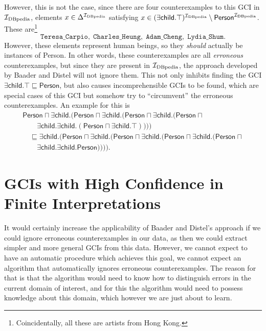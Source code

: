 However, this is not the case, since there are four counterexamples to this GCI in
${\mathcal{I}_{\text{DBpedia}}}$, \ie elements $x \in \Delta^{{\mathcal{I}_{\text{DBpedia}}}}$ satisfying $x \in (\mathsf{\exists
  child. \top})^{{\mathcal{I}_{\text{DBpedia}}}} \setminus \mathsf{Person}^{{\mathcal{I}_{\text{DBpedia}}}}$.  These
are\footnote{Coincidentally, all these are artists from Hong Kong.}
\begin{equation*}
  \mathtt{Teresa\_Carpio},\; \mathtt{Charles\_Heung},\;
  \mathtt{Adam\_Cheng}, \; \mathtt{Lydia\_Shum}.
\end{equation*}
However, these elements represent human beings, so they \emph{should} actually be
instances of \textsf{Person}.  In other words, these counterexamples are all
\emph{erroneous} counterexamples, but since they are present in ${\mathcal{I}_{\text{DBpedia}}}$, the approach
developed by Baader and Distel will not ignore them.  This not only inhibits finding the
GCI $\mathsf{\exists child. \top \sqsubseteq Person}$, but also causes incomprehensible
GCIs to be found, which are special cases of this GCI but somehow try to
\enquote{circumvent} the erroneous counterexamples. An example for this is
\begin{gather*}
  \mathsf{Person \sqcap \exists child. (Person \sqcap \exists child. (Person \sqcap \exists child.
    (Person \sqcap {}}\\
  \quad \quad \mathsf{\exists child. \exists child. (Person \sqcap \exists child. \top))))}
  \\
  \mathsf{ \quad \sqsubseteq
    \exists child. (Person \sqcap \exists child. (Person \sqcap \exists child. (Person \sqcap
    \exists child. (Person \sqcap {}}\\
  \mathsf{\quad \quad \exists child. \exists child. Person))))}.
\end{gather*}

\section{GCIs with High Confidence in Finite Interpretations}
\label{sec:confident-gcis}

It would certainly increase the applicability of Baader and Distel's approach if we could
ignore erroneous counterexamples in our data, as then we could extract simpler and more
general GCIs from this data.  However, we cannot expect to have an automatic procedure
which achieves this goal, \ie we cannot expect an algorithm that automatically ignores
erroneous counterexamples.  The reason for that is that the algorithm would need to know
how to distinguish errors in the current domain of interest, and for this the algorithm
would need to possess knowledge about this domain, which however we are just about to
learn.

